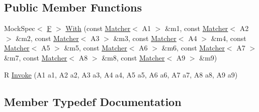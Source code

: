 \subsection*{Public Member Functions}
\begin{DoxyCompactItemize}
\item 
Mock\+Spec$<$ \mbox{\hyperlink{classtesting_1_1internal_1_1FunctionMocker_3_01R_07A1_00_01A2_00_01A3_00_01A4_00_01A5_00_01A6_00_01A7_00_01A8_00_01A9_08_4_a8de64ec5559bd4e4410a4374e9c93e4e}{F}} $>$ \mbox{\hyperlink{classtesting_1_1internal_1_1FunctionMocker_3_01R_07A1_00_01A2_00_01A3_00_01A4_00_01A5_00_01A6_00_01A7_00_01A8_00_01A9_08_4_a1f1550da18c3902fa9afee5e8031cfc9}{With}} (const \mbox{\hyperlink{classtesting_1_1Matcher}{Matcher}}$<$ A1 $>$ \&m1, const \mbox{\hyperlink{classtesting_1_1Matcher}{Matcher}}$<$ A2 $>$ \&m2, const \mbox{\hyperlink{classtesting_1_1Matcher}{Matcher}}$<$ A3 $>$ \&m3, const \mbox{\hyperlink{classtesting_1_1Matcher}{Matcher}}$<$ A4 $>$ \&m4, const \mbox{\hyperlink{classtesting_1_1Matcher}{Matcher}}$<$ A5 $>$ \&m5, const \mbox{\hyperlink{classtesting_1_1Matcher}{Matcher}}$<$ A6 $>$ \&m6, const \mbox{\hyperlink{classtesting_1_1Matcher}{Matcher}}$<$ A7 $>$ \&m7, const \mbox{\hyperlink{classtesting_1_1Matcher}{Matcher}}$<$ A8 $>$ \&m8, const \mbox{\hyperlink{classtesting_1_1Matcher}{Matcher}}$<$ A9 $>$ \&m9)
\item 
R \mbox{\hyperlink{classtesting_1_1internal_1_1FunctionMocker_3_01R_07A1_00_01A2_00_01A3_00_01A4_00_01A5_00_01A6_00_01A7_00_01A8_00_01A9_08_4_a41568c246919848be0f760c61afb3382}{Invoke}} (A1 a1, A2 a2, A3 a3, A4 a4, A5 a5, A6 a6, A7 a7, A8 a8, A9 a9)
\end{DoxyCompactItemize}


\subsection{Member Typedef Documentation}
\mbox{\label{classtesting_1_1internal_1_1FunctionMocker_3_01R_07A1_00_01A2_00_01A3_00_01A4_00_01A5_00_01A6_00_01A7_00_01A8_00_01A9_08_4_afcb802dfc6e26a318bd0599846bff218}} 
